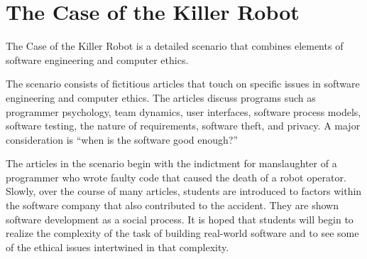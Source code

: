 \chapter{The Case of the Killer Robot}\label{A:killerrobot}

The Case of the Killer Robot is a detailed scenario that combines elements of software engineering and computer ethics.

The scenario consists of fictitious articles that touch on specific issues in software engineering and computer ethics. The articles discuss programs such as programmer psychology, team dynamics, user interfaces, software process models, software testing, the nature of requirements, software theft, and privacy. A major consideration is ``when is the software good enough?''

The articles in the scenario begin with the indictment for manslaughter of a programmer who wrote faulty code that caused the death of a robot operator. Slowly, over the course of many articles, students are introduced to factors within the software company that also contributed to the accident. They are shown software development as a social process. It is hoped that students will begin to realize the complexity of the task of building real-world software and to see some of the ethical issues intertwined in that complexity.

